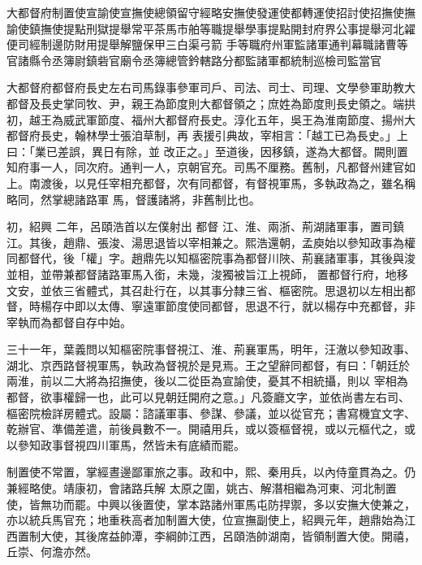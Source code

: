 
\begin{pinyinscope}

 大都督府制置使宣諭使宣撫使總領留守經略安撫使發運使都轉運使招討使招撫使撫諭使鎮撫使提點刑獄提舉常平茶馬市舶等職提舉學事提點開封府界公事提舉河北糴便司經制邊防財用提舉解鹽保甲三白渠弓箭
 手等職府州軍監諸軍通判幕職諸曹等官諸縣令丞簿尉鎮砦官廟令丞簿總管鈐轄路分都監諸軍都統制巡檢司監當官



 大都督府都督府長史左右司馬錄事參軍司戶、司法、司士、司理、文學參軍助教大都督及長史掌同牧、尹，親王為節度則大都督領之；庶姓為節度則長史領之。端拱初，越王為威武軍節度、福州大都督府長史。淳化五年，吳王為淮南節度、揚州大都督府長史，翰林學士張洎草制，再
 表援引典故，宰相言：「越工已為長史。」上曰：「業已差誤，異日有除，並
 改正之。」至道後，因移鎮，遂為大都督。闕則置知府事一人，同次府。通判一人，京朝官充。司馬不厘務。舊制，凡都督州建官如上。南渡後，以見任宰相充都督，次有同都督，有督視軍馬，多執政為之，雖名稱略同，然掌總諸路軍
 馬，督護諸將，非舊制比也。



 初，紹興
 二年，呂頤浩首以左僕射出
 都督
 江、淮、兩浙、荊湖諸軍事，置司鎮江。其後，趙鼎、張浚、湯思退皆以宰相兼之。熙浩還朝，孟庾始以參知政事為權同都督代，後「權」字。趙鼎先以知樞密院事為都督川陜、荊襄諸軍事，其後與浚並相，並帶兼都督諸路軍馬入銜，未幾，浚獨被旨江上視師，
 置都督行府，地移文安，並依三省體式，其召赴行在，以其事分隸三省、樞密院。思退初以左相出都督，時楊存中即以太傳、寧遠軍節度使同都督，思退不行，就以楊存中充都督，非宰執而為都督自存中始。



 三十一年，葉義問以知樞密院事督視江、淮、荊襄軍馬，明年，汪澈以參知政事、湖北、京西路督視軍馬，執政為督視於是見焉。王之望辭同都督，有曰：「朝廷於兩淮，前以二大將為招撫使，後以二從臣為宣諭使，憂其不相統攝，則以
 宰相為都督，欲事權歸一也，此可以見朝廷開府之意。」凡簽廳文字，並依尚書左右司、樞密院檢詳房體式。設屬：諮議軍事、參謀、參議，並以從官充；書寫機宜文字、乾辦官、準備差遣，前後員數不一。開禧用兵，或以簽樞督視，或以元樞代之，或以參知政事督視四川軍馬，然皆未有底績而罷。



 制置使不常置，掌經晝邊鄙軍旅之事。政和中，熙、秦用兵，以內侍童貫為之。仍兼經略使。靖康初，會諸路兵解
 太原之圍，姚古、解潛相繼為河東、河北制置使，皆無功而罷。中興以後置使，掌本路諸州軍馬屯防捍禦，多以安撫大使兼之，亦以統兵馬官充；地重秩高者加制置大使，位宣撫副使上，紹興元年，趙鼎始為江西置制大使，其後席益帥潭，李綱帥江西，呂頤浩帥湖南，皆領制置大使。開禧，丘崇、何澹亦然。




\end{pinyinscope}
